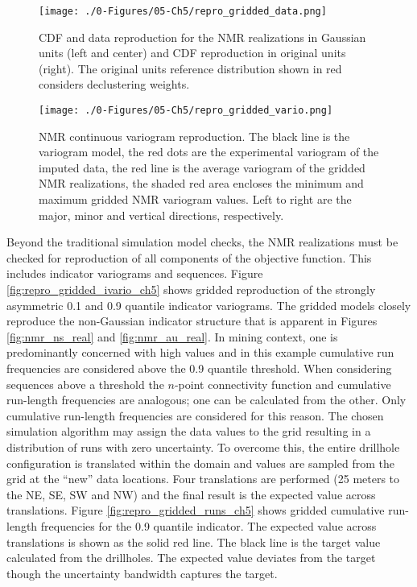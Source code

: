 \begin{figure}[htb!]
    \centering
    \texttt{[image: ./0-Figures/05-Ch5/repro\_gridded\_data.png]}
    \caption{\Gls{CDF} and data reproduction for the \gls{NMR} realizations in Gaussian units (left and center) and \gls{CDF} reproduction in original units (right). The original units reference distribution shown in red considers declustering weights.}
    \label{fig:repro_gridded_data_ch5}
\end{figure}

\begin{figure}[htb!]
    \centering
    \texttt{[image: ./0-Figures/05-Ch5/repro\_gridded\_vario.png]}
    \caption{\gls{NMR} continuous variogram reproduction. The black line is the variogram model, the red dots are the experimental variogram of the imputed data, the red line is the average variogram of the gridded \gls{NMR} realizations, the shaded red area encloses the minimum and maximum gridded \gls{NMR} variogram values. Left to right are the major, minor and vertical directions, respectively.}
    \label{fig:repro_gridded_vario_ch5}
\end{figure}

Beyond the traditional simulation model checks, the \gls{NMR} realizations must be checked for reproduction of all components of the objective function. This includes indicator variograms and sequences. Figure \ref{fig:repro_gridded_ivario_ch5} shows gridded reproduction of the strongly asymmetric 0.1 and 0.9 quantile indicator variograms. The gridded models closely reproduce the non-Gaussian indicator structure that is apparent in Figures \ref{fig:nmr_ns_real} and \ref{fig:nmr_au_real}. In mining context, one is predominantly concerned with high values and in this example cumulative run frequencies are considered above the 0.9 quantile threshold. When considering sequences above a threshold the $n$-point connectivity function and cumulative run-length frequencies are analogous; one can be calculated from the other. Only cumulative run-length frequencies are considered for this reason. The chosen simulation algorithm may assign the data values to the grid resulting in a distribution of runs with zero uncertainty. To overcome this, the entire drillhole configuration is translated within the domain and values are sampled from the grid at the ``new'' data locations. Four translations are performed (25 meters to the NE, SE, SW and NW) and the final result is the expected value across translations. Figure \ref{fig:repro_gridded_runs_ch5} shows gridded cumulative run-length frequencies for the 0.9 quantile indicator. The expected value across translations is shown as the solid red line. The black line is the target value calculated from the drillholes. The expected value deviates from the target though the uncertainty bandwidth captures the target.

